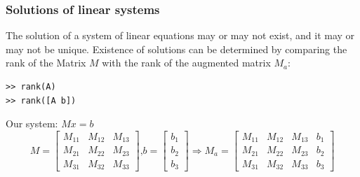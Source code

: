 \documentclass[11pt,table,final,xcolor={usenames,dvipsnames,table}]{beamer}
\begin{document}
\begin{frame}[fragile]
  \frametitle{Solutions of linear systems}
  The solution of a system of linear equations may or may not exist, and it may or may not be unique. Existence of solutions can be determined by comparing the rank of the Matrix $M$ with the rank of the augmented matrix $M_a$:
  \begin{lstlisting}
>> rank(A)
>> rank([A b])
  \end{lstlisting}
  Our system: $Mx = b$\\
  \[ 
    M = \begin{bmatrix}
    M_{11} & M_{12} & M_{13}\\ 
    M_{21} & M_{22} & M_{23}\\ 
    M_{31} & M_{32} & M_{33}
    \end{bmatrix} \text{,} b=\begin{bmatrix}b_1\\b_2\\b_3  \end{bmatrix} \Rightarrow 
    M_a =     \begin{bmatrix}
    M_{11} & M_{12} & M_{13} & b_1\\ 
    M_{21} & M_{22} & M_{23} & b_2\\ 
    M_{31} & M_{32} & M_{33} & b_3
    \end{bmatrix}
  \]
\end{frame}
\end{document}
